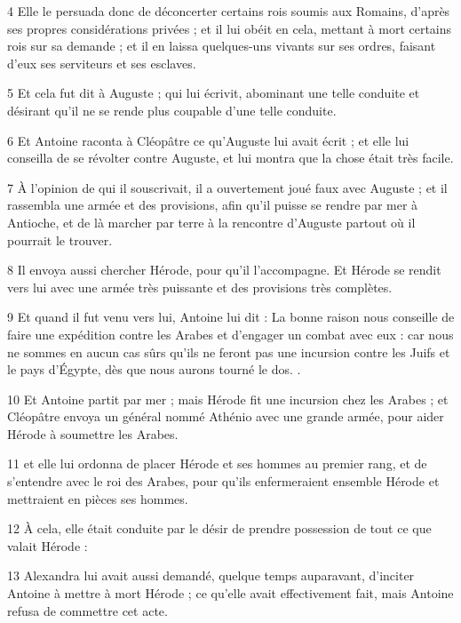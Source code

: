 \par 4 Elle le persuada donc de déconcerter certains rois soumis aux Romains, d'après ses propres considérations privées ; et il lui obéit en cela, mettant à mort certains rois sur sa demande ; et il en laissa quelques-uns vivants sur ses ordres, faisant d'eux ses serviteurs et ses esclaves.

\par 5 Et cela fut dit à Auguste ; qui lui écrivit, abominant une telle conduite et désirant qu'il ne se rende plus coupable d'une telle conduite.

\par 6 Et Antoine raconta à Cléopâtre ce qu'Auguste lui avait écrit ; et elle lui conseilla de se révolter contre Auguste, et lui montra que la chose était très facile.

\par 7 À l'opinion de qui il souscrivait, il a ouvertement joué faux avec Auguste ; et il rassembla une armée et des provisions, afin qu'il puisse se rendre par mer à Antioche, et de là marcher par terre à la rencontre d'Auguste partout où il pourrait le trouver.

\par 8 Il envoya aussi chercher Hérode, pour qu'il l'accompagne. Et Hérode se rendit vers lui avec une armée très puissante et des provisions très complètes.

\par 9 Et quand il fut venu vers lui, Antoine lui dit : La bonne raison nous conseille de faire une expédition contre les Arabes et d'engager un combat avec eux : car nous ne sommes en aucun cas sûrs qu'ils ne feront pas une incursion contre les Juifs et le pays d'Égypte, dès que nous aurons tourné le dos. .

\par 10 Et Antoine partit par mer ; mais Hérode fit une incursion chez les Arabes ; et Cléopâtre envoya un général nommé Athénio avec une grande armée, pour aider Hérode à soumettre les Arabes.

\par 11 et elle lui ordonna de placer Hérode et ses hommes au premier rang, et de s'entendre avec le roi des Arabes, pour qu'ils enfermeraient ensemble Hérode et mettraient en pièces ses hommes.

\par 12 À cela, elle était conduite par le désir de prendre possession de tout ce que valait Hérode :

\par 13 Alexandra lui avait aussi demandé, quelque temps auparavant, d'inciter Antoine à mettre à mort Hérode ; ce qu'elle avait effectivement fait, mais Antoine refusa de commettre cet acte.

